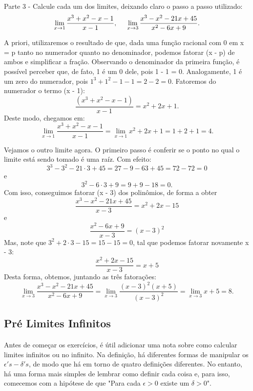 \documentclass[Calculus1/exercícios_de_cálculo.tex]{subfiles}
\begin{document}
\paragraph{} Parte 3 - Calcule cada um dos limites, deixando claro o passo a passo utilizado:
$$
	\lim_{x\to1} \frac{x^3 + x^2 - x - 1}{x - 1}, \hspace{0.5cm} \lim_{x\to3}\frac{x^3 - x^2 - 21x + 45}{x^2 - 6x + 9}.
$$
\begin{sol*}
	A priori, utilizaremos o resultado de que, dada uma função racional com 0 em x = p tanto no numerador quanto no denominador, podemos fatorar (x - p) de ambos e simplificar a fração. Observando o denominador da primeira funç\~ao, é possível perceber que, de fato, 1 é um 0 dele, pois 1 - 1 = 0. Analogamente, 1 é um zero do numerador, pois $1^3 + 1^2 - 1 - 1 = 2 - 2 = 0$. Fatoremos do numerador o termo (x - 1):
	$$
		\frac{(x^3 + x^2 - x - 1)}{x - 1} = x^2 + 2x + 1.
	$$
	Deste modo, chegamos em:
	$$
		\lim_{x\to{1}}\frac{x^3 + x^2 - x - 1}{x - 1} = \lim_{x\to{1}}x^2 + 2x + 1 = 1 + 2 + 1 = 4.
	$$

	Vejamos o outro limite agora. O primeiro passo é conferir se o ponto no qual o limite está sendo tomado é uma raíz. Com efeito:
	$$
		3^3 - 3^2 - 21\cdot{3} + 45 = 27 - 9 - 63 + 45 = 72 - 72 = 0
	$$
	e
	$$
		3^2 - 6\cdot{3} + 9 = 9 + 9 - 18 = 0.
	$$
	Com isso, conseguimos fatorar (x - 3) dos polinômios, de forma a obter
	$$
		\frac{x^3 - x^2 - 21x + 45}{x-3} = x^2 + 2x - 15
	$$
	e
	$$
		\frac{x^2 - 6x + 9}{x - 3}  = (x - 3)^2
	$$
	Mas, note que $3^2 + 2\cdot{3} - 15 = 15 - 15 = 0$, tal que podemos fatorar novamente x - 3:
	$$
		\frac{x^2 + 2x - 15}{x - 3} = x + 5
	$$
	Desta forma, obtemos, juntando as três fatorações:
	$$
		\lim_{x\to3}\frac{x^3 - x^2 - 21x + 45}{x^2 - 6x + 9} = \lim_{x\to3}\frac{(x - 3)^2 (x+5)}{(x - 3)^2} = \lim_{x\to3}x + 5 = 8.
	$$
	\qedsymbol
\end{sol*}

\subsection{Pré Limites Infinitos}
\paragraph{} Antes de começar os exercícios, é útil adicionar uma nota sobre como calcular limites infinitos ou no infinito. Na definição, há diferentes formas de manipular os $\epsilon's-\delta's$, de modo que há em torno de quatro definições diferentes. No entanto, há uma forma mais simples de lembrar como definir cada coisa e, para isso, comecemos com a hipótese de que "Para cada $\epsilon > 0$ existe um $\delta > 0$".
\end{document}
